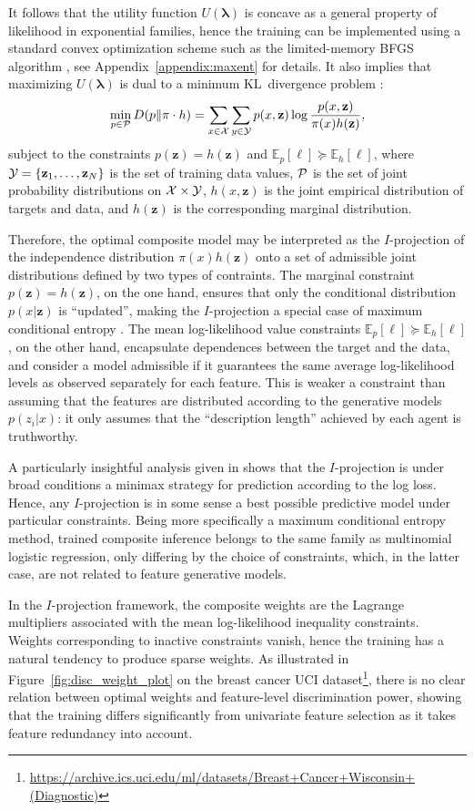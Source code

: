 \documentclass[english]{scrartcl}
\def\y{{\mathbf{y}}}
\def\y{{\mathbf{z}}}
\newcommand{\blambda}{{\boldsymbol{\lambda}}}
\newcommand{\bell}{{\boldsymbol{\ell}}}
\newcommand{\E}{\mathbb{E}}
\begin{document}
It follows that the utility function $U(\blambda)$ is concave as a general property of likelihood in exponential families, hence the training can be implemented using a standard convex optimization scheme such as the limited-memory BFGS algorithm \cite{Byrd-95}, see Appendix~\ref{appendix:maxent} for details. It also implies that maximizing $U(\blambda)$ is dual to a minimum KL~divergence problem \cite{Csiszar-84}:
$$
\min_{p\in{\cal P}} D(p\|\pi \cdot h) = \sum_{x\in{\cal X}}\sum_{y\in{\cal Y}} p(x,\y) \log \frac{p(x,\y)}{\pi(x)h(\y)},
$$
subject to the constraints $p(\y)=h(\y)$ and $\E_p[\bell] \succeq \E_h[\bell]$, where 
${\cal Y}=\{\y_1,\ldots,\y_N\}$ is the set of training data values, ${\cal P}$ is the set of joint probability distributions on ${\cal X}\times {\cal Y}$, $h(x,\y)$ is the joint empirical distribution of targets and data, and $h(\y)$ is the corresponding marginal distribution. 

Therefore, the optimal composite model may be interpreted as the $I$-projection of the independence distribution $\pi(x)h(\y)$ onto a set of admissible joint distributions defined by two types of contraints. The marginal constraint $p(\y)=h(\y)$, on the one hand,  ensures that only the conditional distribution $p(x|\y)$ is ``updated'', making the $I$-projection a special case of maximum conditional entropy \cite{BergerA-96}. The mean log-likelihood value constraints $\E_p[\bell] \succeq \E_h[\bell]$, on the other hand, encapsulate dependences between the target and the data, and consider a model admissible if it guarantees the same average log-likelihood levels as observed separately for each feature. This is weaker a constraint than assuming that the features are distributed according to the generative models $p(z_i|x)$: it only assumes that the ``description length'' \cite{Grunwald-07} achieved by each agent is truthworthy.

A particularly insightful analysis given in \cite{Grunwald-04} shows that the $I$-projection is under broad conditions a minimax strategy for prediction according to the log loss. Hence, any $I$-projection is in some sense a best possible predictive model under particular constraints. Being more specifically a maximum conditional entropy method, trained composite inference belongs to the same family as multinomial logistic regression, only differing by the choice of constraints, which, in the latter case, are not related to feature generative models.

In the $I$-projection framework, the composite weights are the Lagrange multipliers associated with the mean log-likelihood inequality constraints. Weights corresponding to inactive constraints vanish, hence the training has a natural tendency to produce sparse weights. As illustrated in Figure~\ref{fig:disc_weight_plot} on the breast cancer UCI dataset\footnote{\url{https://archive.ics.uci.edu/ml/datasets/Breast+Cancer+Wisconsin+(Diagnostic)}}, there is no clear relation between optimal weights and feature-level discrimination power, showing that the training differs significantly from univariate feature selection as it takes feature redundancy into account.
\end{document}
